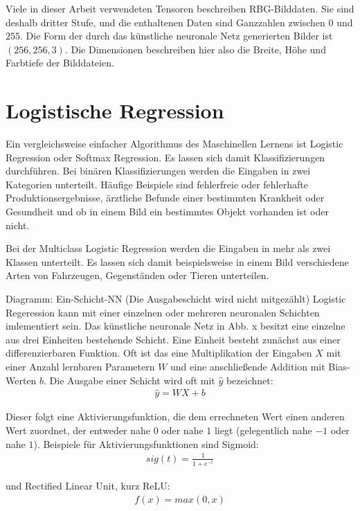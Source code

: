 Viele in dieser Arbeit verwendeten Tensoren beschreiben RBG-Bilddaten. Sie sind deshalb dritter Stufe, und die enthaltenen Daten sind Ganzzahlen zwischen $0$ und $255$. Die Form der durch das künstliche neuronale Netz generierten Bilder ist $(256, 256, 3)$. Die Dimensionen beschreiben hier also die Breite, Höhe und Farbtiefe der Bilddateien.


\section{Logistische Regression}
\label{sec:logreg}
Ein vergleichsweise einfacher Algorithmus des Maschinellen Lernens ist Logistic Regression oder Softmax Regression. Es lassen sich damit Klassifizierungen durchführen. Bei binären Klassifizierungen werden die Eingaben in zwei Kategorien unterteilt. Häufige Beispiele sind fehlerfreie oder fehlerhafte Produktionsergebnisse, ärztliche Befunde einer bestimmten Krankheit oder Gesundheit und ob in einem Bild ein bestimmtes Objekt vorhanden ist oder nicht.

Bei der Multiclass Logistic Regression werden die Eingaben in mehr als zwei Klassen unterteilt. Es lassen sich damit beispielsweise in einem Bild  verschiedene Arten von Fahrzeugen, Gegenständen oder Tieren unterteilen.

Diagramm: Ein-Schicht-NN (Die Ausgabeschicht wird nicht mitgezählt) Logistic Regeression kann mit einer einzelnen oder mehreren neuronalen Schichten imlementiert sein. Das künstliche neuronale Netz in Abb. x besitzt eine einzelne aus drei Einheiten bestehende Schicht. Eine Einheit besteht zunächst aus einer differenzierbaren Funktion. Oft ist das eine Multiplikation der Eingaben $X$ mit einer Anzahl lernbaren Parametern $W$ und eine anschließende Addition mit Bias-Werten $b$. Die Ausgabe einer Schicht wird oft mit $\hat{y}$ bezeichnet:
\begin{align}
\hat{y} = WX+b
\end{align}

Dieser folgt eine Aktivierungsfunktion, die dem errechneten Wert einen anderen Wert zuordnet, der entweder nahe $0$ oder nahe $1$ liegt (gelegentlich nahe $-1$ oder nahe $1$). Beispiele für Aktivierungsfunktionen sind Sigmoid:
\begin{align}
sig(t) = \frac{1}{1+e^{-t}}
\end{align}

und Rectified Linear Unit, kurz ReLU:
\begin{align}
f(x) = max(0, x)
\end{align}

